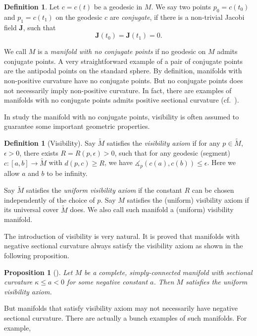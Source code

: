 \documentclass[reqno,11pt]{article}
\newtheorem{proposition}[theorem]{Proposition}
\theoremstyle{definition}
\newtheorem{definition}[theorem]{Definition}
\theoremstyle{remark}
\numberwithin{equation}{section}
\begin{document}
\begin{definition}
    Let $c=c(t)$ be a geodesic in $M$. We say two points $p_0=c(t_0)$ and $p_1=c(t_1)$ on the geodesic $c$ are \emph{conjugate}, if there is a non-trivial Jacobi field $\bm{J}$, such that
	\begin{displaymath}
        \bm{J}(t_0)=\bm{J}(t_1)=0.
	\end{displaymath}
\end{definition}

We call $M$ is a \emph{manifold with no conjugate points} if no geodesic on $M$ admits conjugate points. A very straightforward example of a pair of conjugate points are the antipodal points on the standard sphere. By definition, manifolds with non-positive curvature have no conjugate points. But no conjugate points does not necessarily imply non-positive curvature. In fact, there are examples of manifolds with no conjugate points admits positive sectional curvature (cf.~\cite{Gu}).

In study the manifold with no conjugate points, visibility is often assumed to guarantee some important geometric properties. 


\begin{definition}[Visibility]
    Say $\widetilde{M}$ satisfies the \emph{visibility axiom} if for any $p\in\widetilde{M}$, $\epsilon>0$, there exists $R=R(p,\epsilon)>0$, such that for any geodesic (segment) $c:[a,b] \to \widetilde{M}$ with $d(p,c)\geq R$, we have $\measuredangle_p(c(a),c(b))\leq\epsilon$. Here we allow $a$ and $b$ to be infinity.

    Say $\widetilde{M}$ satisfies the \emph{uniform visibility axiom} if the constant $R$ can be chosen independently of the choice of $p$. Say $M$ satisfies the (uniform) visibility axiom if its universal cover $\widetilde{M}$ does. We also call such manifold a (uniform) visibility manifold.
\end{definition}

The introduction of visibility is very natural. It is proved that manifolds with negative sectional curvature always satisfy the visibility axiom as shown in the following proposition.

\begin{proposition}[\cite{BO}]
	Let $M$ be a complete, simply-connected manifold with sectional curvature $\kappa\leq a <0$ for some negative constant $a$. Then $M$ satisfies the uniform visibility axiom.
\end{proposition}

But manifolds that satisfy visibility axiom may not necessarily have negative sectional curvature. There are actually a bunch examples of such manifolds. For example,
\end{document}
